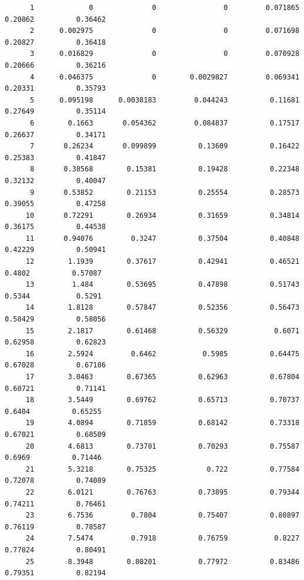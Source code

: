 \documentclass[
]{book}
\begin{document}
\begin{verbatim}
      1             0              0                0         0.071865          0.20862          0.36462   
      2      0.002975              0                0         0.071698          0.20827          0.36418   
      3      0.016829              0                0         0.070928          0.20666          0.36216   
      4      0.046375              0        0.0029827         0.069341          0.20331          0.35793   
      5      0.095198      0.0038183         0.044243          0.11681          0.27649          0.35114   
      6        0.1663       0.054362         0.084837          0.17517          0.26637          0.34171   
      7       0.26234       0.099899          0.13609          0.16422          0.25383          0.41847   
      8       0.38568        0.15381          0.19428          0.22348          0.32132          0.40047   
      9       0.53852        0.21153          0.25554          0.28573          0.39055          0.47258   
     10       0.72291        0.26934          0.31659          0.34814          0.36175          0.44538   
     11       0.94076         0.3247          0.37504          0.40848          0.42229          0.50941   
     12        1.1939        0.37617          0.42941          0.46521           0.4802          0.57087   
     13         1.484        0.53695          0.47898          0.51743           0.5344           0.5291   
     14        1.8128        0.57847          0.52356          0.56473          0.58429          0.58056   
     15        2.1817        0.61468          0.56329           0.6071          0.62958          0.62823   
     16        2.5924         0.6462           0.5985          0.64475          0.67028          0.67186   
     17        3.0463        0.67365          0.62963          0.67804          0.60721          0.71141   
     18        3.5449        0.69762          0.65713          0.70737           0.6404          0.65255   
     19        4.0894        0.71859          0.68142          0.73318          0.67021          0.68509   
     20        4.6813        0.73701          0.70293          0.75587           0.6969          0.71446   
     21        5.3218        0.75325            0.722          0.77584          0.72078          0.74089   
     22        6.0121        0.76763          0.73895          0.79344          0.74211          0.76461   
     23        6.7536         0.7804          0.75407          0.80897          0.76119          0.78587   
     24        7.5474         0.7918          0.76759           0.8227          0.77824          0.80491   
     25        8.3948        0.80201          0.77972          0.83486          0.79351          0.82194   

\end{verbatim}
\end{document}
